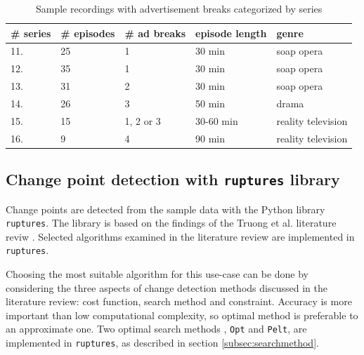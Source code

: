 \begin{table}[H]
    \begin{center}
    \begin{tabular}{|p{15mm}|p{20mm}|p{22mm}|p{28mm}|p{30mm}|} %
        \hline
        \textbf{\# series} & \textbf{\# episodes} & \textbf{\# ad breaks} & \textbf{episode length} & \textbf{genre}  \\ \hline
        11. & 25 & 1 & 30 min & soap opera\\ \hline
        12. & 35 & 1 & 30 min & soap opera\\ \hline
        13. & 31 & 2 & 30 min & soap opera\\ \hline
        14. & 26 & 3 & 50 min & drama\\ \hline
        15. & 15 & 1, 2 or 3 & 30-60 min & reality television\\ \hline
        16. &  9 & 4 & 90 min & reality television\\ \hline
    \end{tabular}
    \end{center}
    \caption{Sample recordings with advertisement breaks categorized by series}
    \label{tab:data_ads}
\end{table}

\subsection{Change point detection with \texttt{ruptures} library} \label{subsec:solution}

Change points are detected from the sample data with the Python library \texttt{ruptures}.
The library is based on the findings of the Truong et al. literature reviw \cite{truongSelectiveReviewOffline2020}. %
Selected algorithms examined in the literature review are implemented in \texttt{ruptures}.

Choosing the most suitable algorithm %
for this use-case can be done by considering the three aspects of change detection methods discussed in the literature review: cost function, search method and constraint. Accuracy is more important than low computational complexity, so optimal method is preferable to an approximate one. Two optimal search methods , \texttt{Opt} and \texttt{Pelt}, are implemented in \texttt{ruptures}, as described in section \ref{subsec:searchmethod}.

